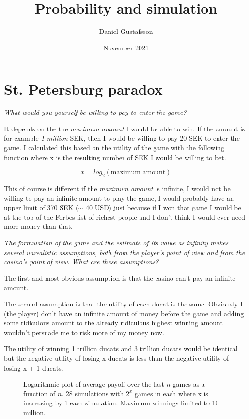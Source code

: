 \documentclass[11pt, a4papaer]{article}
\title{Probability and simulation}
\author{Daniel Gustafsson}
\date{November 2021}
\begin{document}
\maketitle

\section{St. Petersburg paradox}

\textit{What would you yourself be willing to pay to enter the game?}

\vspace{2mm}\noindent
It depends on the the \textit{maximum amount} I would be able to win.
If the amount is for example \textit{1 million} SEK, then I would be willing to pay 20 SEK to enter the game.
I calculated this based on the utility of the game with the following function where x is the resulting
number of SEK I would be willing to bet.

\[x = log_2(\text{maximum amount})\]

This of course is different if the \textit{maximum amount} is infinite, I would not be willing to pay an infinite
amount to play the game, I would probably have an upper limit of 370 SEK ($\sim$ 40 USD) just because if I won that game I would
be at the top of the Forbes list of richest people and I don't think I would ever need more money than that.

\textit{The formulation of the game and the estimate of its value as infinity makes several unrealistic assumptions,
both from the player's point of view and from the casino's point of view. What are these assumptions?}

\vspace{2mm}\noindent
The first and most obvious assumption is that the casino can't pay an infinite amount.

\vspace{1mm}\noindent
The second assumption is that the utility of each ducat is the same. Obviously I (the player) don't have
an infinite amount of money before the game and adding some ridiculous amount to the already ridiculous highest winning amount
wouldn't persuade me to risk more of my money now. 

The utility of winning 1 trillion ducats and 3 trillion ducats would be identical but the negative utility of losing x ducats is less
than the negative utility of losing x + 1 ducats.

\begin{figure}[h]
	\label{fig:st_petersburg}
	\centering
	\caption{Logarithmic plot of average payoff over the last $n$ games as a function of $n$. 28 simulations with $2^x$ games in each 
	where x is increasing by 1 each simulation.
	Maximum winnings limited to 10 million.}
	
\end{figure}
\end{document}
